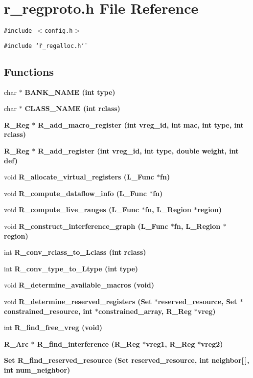 \section{r\_\-regproto.h File Reference}
\label{r__regproto_8h}
{\tt \#include $<$config.h$>$}\par
{\tt \#include \char`\"{}r\_\-regalloc.h\char`\"{}}\par
\subsection*{Functions}
\begin{CompactItemize}
\item 
char $\ast$ \bf{BANK\_\-NAME} (int type)
\item 
char $\ast$ \bf{CLASS\_\-NAME} (int rclass)
\item 
\bf{R\_\-Reg} $\ast$ \bf{R\_\-add\_\-macro\_\-register} (int vreg\_\-id, int mac, int type, int rclass)
\item 
\bf{R\_\-Reg} $\ast$ \bf{R\_\-add\_\-register} (int vreg\_\-id, int type, double weight, int def)
\item 
void \bf{R\_\-allocate\_\-virtual\_\-registers} (L\_\-Func $\ast$fn)
\item 
void \bf{R\_\-compute\_\-dataflow\_\-info} (L\_\-Func $\ast$fn)
\item 
void \bf{R\_\-compute\_\-live\_\-ranges} (L\_\-Func $\ast$fn, L\_\-Region $\ast$\bf{region})
\item 
void \bf{R\_\-construct\_\-interference\_\-graph} (L\_\-Func $\ast$fn, L\_\-Region $\ast$\bf{region})
\item 
int \bf{R\_\-conv\_\-rclass\_\-to\_\-Lclass} (int rclass)
\item 
int \bf{R\_\-conv\_\-type\_\-to\_\-Ltype} (int type)
\item 
void \bf{R\_\-determine\_\-available\_\-macros} (void)
\item 
void \bf{R\_\-determine\_\-reserved\_\-registers} (\bf{Set} $\ast$reserved\_\-resource, \bf{Set} $\ast$constrained\_\-resource, int $\ast$constrained\_\-array, \bf{R\_\-Reg} $\ast$vreg)
\item 
int \bf{R\_\-find\_\-free\_\-vreg} (void)
\item 
\bf{R\_\-Arc} $\ast$ \bf{R\_\-find\_\-interference} (\bf{R\_\-Reg} $\ast$vreg1, \bf{R\_\-Reg} $\ast$vreg2)
\item 
\bf{Set} \bf{R\_\-find\_\-reserved\_\-resource} (\bf{Set} reserved\_\-resource, int neighbor[$\,$], int num\_\-neighbor)

\end{CompactItemize}
